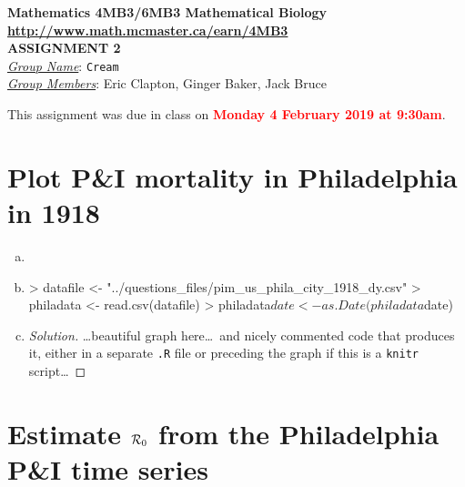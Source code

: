 \documentclass[12pt]{article}
\begin{document}


\begin{center}
{\bf Mathematics 4MB3/6MB3 Mathematical Biology\\
\smallskip
\url{http://www.math.mcmaster.ca/earn/4MB3}\\
 ASSIGNMENT 2}\\
\medskip
\underline{\emph{Group Name}}: \texttt{{\color{blue}Cream}}\\
\medskip
\underline{\emph{Group Members}}: {\color{blue}Eric Clapton, Ginger Baker, Jack Bruce}
\end{center}

\bigskip
\noindent
This assignment was due in class on \textcolor{red}{\bf Monday 4 February 2019 at 9:30am}.

\section{Plot P\&I mortality in Philadelphia in 1918}

\begin{enumerate}[(a)]

\item \PhilaDataReceived

\item \PhilaDataReadA
\begin{Schunk}
\begin{Sinput}
> datafile <- "../questions_files/pim_us_phila_city_1918_dy.csv"
> philadata <- read.csv(datafile)
> philadata$date <- as.Date(philadata$date)
\end{Sinput}
\end{Schunk}
\PhilaDataReadB

\item \PhilaDataReproduceA

  {\color{blue} \begin{proof}[Solution]
  {\color{magenta}\dots beautiful graph here\dots\ and nicely commented code that produces it, either in a separate \texttt{.R} file or preceding the graph if this is a \texttt{knitr} script\dots}
  \end{proof}
  }

\PhilaDataReproduceB

\end{enumerate}

\section{Estimate ${\cal R}_0$ from the Philadelphia P\&I time series}
\end{document}
